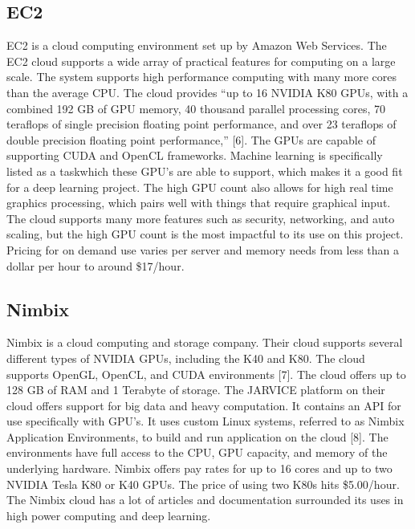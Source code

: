 \documentclass{scrreprt}
\begin{document}
\subsection{EC2}
EC2 is a cloud computing environment set up by Amazon Web Services. The EC2 cloud supports a wide array of practical features for computing on a large scale. 
The system supports high performance computing with many more cores than the average CPU. The cloud provides “up to 16 NVIDIA K80 GPUs, with a combined 192 GB of GPU memory, 40 thousand parallel processing cores, 70 teraflops of single precision floating point performance, and over 23 teraflops of double precision floating point performance,” [6]. 
The GPUs are capable of supporting CUDA and OpenCL frameworks. 
Machine learning is specifically listed as a taskwhich these GPU’s are able to support, which makes it a good fit for a deep learning project. 
The high GPU count also allows for high real time graphics processing, which pairs well with things that require graphical input.
The cloud supports many more features such as security, networking, and auto scaling, but the high GPU count is the most impactful to its use on this project. 
Pricing for on demand use varies per server and memory needs from less than a dollar per hour to around \$17/hour.

\subsection{Nimbix}
Nimbix is a cloud computing and storage company. 
Their cloud supports several different types of NVIDIA GPUs, including the K40 and K80. 
The cloud supports OpenGL, OpenCL, and CUDA environments [7]. 
The cloud offers up to 128 GB of RAM and 1 Terabyte of storage. 
The JARVICE platform on their cloud offers support for big data and heavy computation. 
It contains an API for use specifically with GPU’s. 
It uses custom Linux systems, referred to as Nimbix Application Environments, to build and run application on the cloud [8]. 
The environments have full access to the CPU, GPU capacity, and memory of the underlying hardware. 
Nimbix offers pay rates for up to 16 cores and up to two NVIDIA Tesla K80 or K40 GPUs. 
The price of using two K80s hits \$5.00/hour. 
The Nimbix cloud has a lot of articles and documentation surrounded its uses in high power computing and deep learning.
\end{document}
